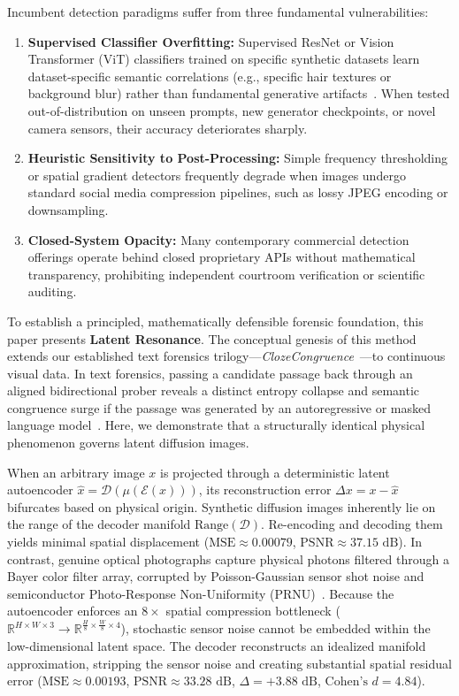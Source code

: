 \documentclass[conference]{IEEEtran}
\theoremstyle{definition}
\begin{document}
Incumbent detection paradigms suffer from three fundamental vulnerabilities:
\begin{enumerate}
    \item \textbf{Supervised Classifier Overfitting:} Supervised ResNet or Vision Transformer (ViT) classifiers trained on specific synthetic datasets learn dataset-specific semantic correlations (e.g., specific hair textures or background blur) rather than fundamental generative artifacts~\cite{wang2020cnn,ojha2023towards}. When tested out-of-distribution on unseen prompts, new generator checkpoints, or novel camera sensors, their accuracy deteriorates sharply.
    \item \textbf{Heuristic Sensitivity to Post-Processing:} Simple frequency thresholding or spatial gradient detectors frequently degrade when images undergo standard social media compression pipelines, such as lossy JPEG encoding or downsampling.
    \item \textbf{Closed-System Opacity:} Many contemporary commercial detection offerings operate behind closed proprietary APIs without mathematical transparency, prohibiting independent courtroom verification or scientific auditing.
\end{enumerate}

To establish a principled, mathematically defensible forensic foundation, this paper presents \textbf{Latent Resonance}. The conceptual genesis of this method extends our established text forensics trilogy---\textit{ClozeCongruence}~\cite{bandyopadhyay2026cloze1,bandyopadhyay2026dna,bandyopadhyay2026scaling,bandyopadhyay2026cloze3}---to continuous visual data. In text forensics, passing a candidate passage back through an aligned bidirectional prober reveals a distinct entropy collapse and semantic congruence surge if the passage was generated by an autoregressive or masked language model~\cite{bandyopadhyay2026cloze1}. Here, we demonstrate that a structurally identical physical phenomenon governs latent diffusion images.

When an arbitrary image $x$ is projected through a deterministic latent autoencoder $\hat{x} = \mathcal{D}(\mu(\mathcal{E}(x)))$, its reconstruction error $\Delta x = x - \hat{x}$ bifurcates based on physical origin. Synthetic diffusion images inherently lie on the range of the decoder manifold $\text{Range}(\mathcal{D})$. Re-encoding and decoding them yields minimal spatial displacement ($\text{MSE} \approx 0.00079$, $\text{PSNR} \approx 37.15\text{ dB}$). In contrast, genuine optical photographs capture physical photons filtered through a Bayer color filter array, corrupted by Poisson-Gaussian sensor shot noise and semiconductor Photo-Response Non-Uniformity (PRNU)~\cite{fridrich2009digital,lukas2006digital}. Because the autoencoder enforces an $8\times$ spatial compression bottleneck ($\mathbb{R}^{H \times W \times 3} \to \mathbb{R}^{\frac{H}{8} \times \frac{W}{8} \times 4}$), stochastic sensor noise cannot be embedded within the low-dimensional latent space. The decoder reconstructs an idealized manifold approximation, stripping the sensor noise and creating substantial spatial residual error ($\text{MSE} \approx 0.00193$, $\text{PSNR} \approx 33.28\text{ dB}$, $\Delta = +3.88\text{ dB}$, $\text{Cohen's } d = 4.84$).
\end{document}
